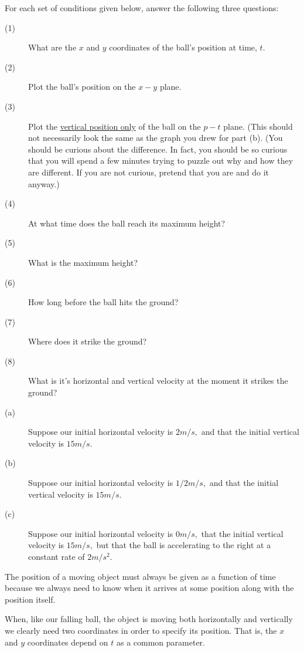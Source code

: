 \begin{embeddedproblem}{}
For each set of conditions given below, answer the following three questions:
    \begin{description}
    \item[(1)] What are the $x$ and $y$ coordinates of the ball's
      position at time, $t.$
    \item[(2)] Plot the ball's position on the $x-y$ plane.
    \item[(3)] Plot the \underline{vertical position only} of the ball
      on the $p-t$ plane. (This should not necessarily look the same
      as the graph you drew for part (b). (You should be curious about
      the difference. In fact, you should be so curious that you will
      spend a few minutes trying to puzzle out why and how they are
      different. If you are not curious, pretend that you are and do
      it anyway.)
    \item[(4)] At what time does the ball reach its maximum height?
    \item[(5)] What is the maximum height?
    \item[(6)] How long before the ball hits the ground?
    \item[(7)] Where does it strike the ground?
    \item[(8)] What is it's horizontal and vertical velocity at the
      moment it strikes the ground?
    \end{description}

  \begin{description}
   \item[(a)] Suppose our initial horizontal velocity is $2 m/s,$ and that
    the initial vertical velocity is $15 m/s.$
  \item[(b)] Suppose our initial horizontal velocity is $1/2 m/s,$ and that
    the initial vertical velocity is $15 m/s.$
  \item[(c)] Suppose our initial horizontal velocity is $0 m/s,$  that
    the initial vertical velocity is $15 m/s,$ but
    that the ball is accelerating to the right at a constant rate of
    $2 m/s^2.$
 \end{description}
\end{embeddedproblem}

The position of a moving object must always be given as a function of
time because we always need to know when it arrives at some position
along with the position itself.

When, like our falling ball, the object is moving both horizontally
and vertically we clearly need two coordinates in order to specify its
position. That is, the $x$ and $y$ coordinates depend on $t$ as a
common parameter.

